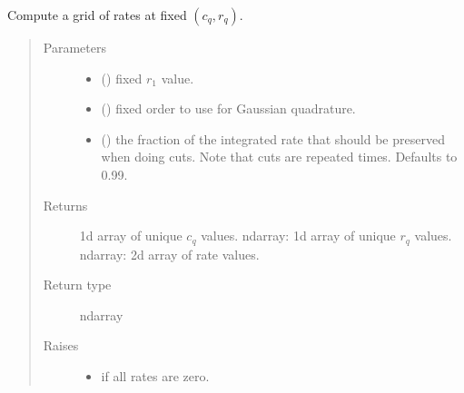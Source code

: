 \documentclass[letterpaper,10pt,english]{sphinxmanual}
\begin{document}
\begin{fulllineitems}

\begin{fulllineitems}
\label{\detokenize{code_structure:scdc.initial.distribution.integral.InitialSampler.q_rate_grid}}
Compute a grid of rates at fixed \((c_q,r_q)\).
\begin{quote}\begin{description}
\item[{Parameters}] \leavevmode\begin{itemize}
\item {} 
 () \textendash{} fixed \(r_1\) value.

\item {} 
 (\sphinxstyleliteralemphasis{\sphinxupquote{, }}) \textendash{} fixed order to use for Gaussian quadrature.

\item {} 
 (\sphinxstyleliteralemphasis{\sphinxupquote{, }}) \textendash{} the fraction of the integrated rate
that should be preserved when doing cuts. Note that cuts are
repeated  times. Defaults to 0.99.

\end{itemize}

\item[{Returns}] \leavevmode
1d array of unique \(c_q\) values.
ndarray: 1d array of unique \(r_q\) values.
ndarray: 2d array of rate values.

\item[{Return type}] \leavevmode
ndarray

\item[{Raises}] \leavevmode\begin{itemize}
\item {} 
 \textendash{} if all rates are zero.


\end{itemize}
\end{description}
\end{quote}
\end{fulllineitems}
\end{fulllineitems}
\end{document}
